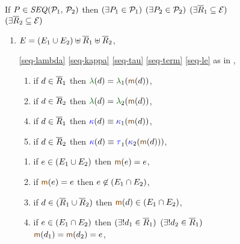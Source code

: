 \begin{figure}
  \raggedright
  
  \noindent
  If $\aPS \in \sSEMI{\aPSS_1}{\aPSS_2}$ then
  $(\exists P_1\in\mathcal{P}_1)$ $(\exists P_2\in\mathcal{P}_2)$
  $(\exists\overline{R}_1\subseteq\mathcal{E})$ $(\exists\overline{R}_2\subseteq\mathcal{E})$
  \begin{multicols}{2}
    \begin{enumerate}[topsep=0pt,label=(\textsc{s}\arabic*),ref=\textsc{s}\arabic*]
      \setcounter{enumi}{\value{BE}}
    \item \label{seq-E-phantom}
      $E=(E_1\cup E_2)\uplus\overline{R}_1 \uplus\overline{R}_2$,

    \item[\eqref{seq-lambda}]
      \eqref{seq-kappa}\;
      \eqref{seq-tau}\;
      \eqref{seq-term}\;
      \eqref{seq-le}\;
      as in ,

      \setcounter{enumi}{\value{lambda}}
    \item[] 
      \begin{enumerate}[leftmargin=0pt]
      \item \label{seq-lambda-phantom1}
        if $d\in \overline{R}_1$ then $\labeling(\bEv)=\labeling_1(\fmrg{\bEv})$,
      \item \label{seq-lambda-phantom2}
        if $d\in \overline{R}_2$ then $\labeling(\bEv)=\labeling_2(\fmrg{\bEv})$,
      \end{enumerate}

      \setcounter{enumi}{\value{kappa}}
    \item[] 
      \begin{enumerate}[leftmargin=0pt]
        \setcounter{enumii}{3}
      \item \label{seq-kappa-phantom1}
        if $d\in \overline{R}_1$ then $\labelingForm(\bEv)\riff\labelingForm_1(\fmrg{\bEv})$,
      \item \label{seq-kappa-phantom2}
        if $d\in \overline{R}_2$ then $\labelingForm(\bEv)\riff\aTr[1]{}{\labelingForm_2(\fmrg{\bEv})}$,
      \end{enumerate}

      \columnbreak
      \setcounter{enumi}{\value{m}}
    \item[] 
      \begin{enumerate}[leftmargin=0pt]
      \item \label{seq-m-real-cup}
        if $e\in(E_1\cup E_2)$ then $\fmrg{\aEv}=\aEv$,
      \item \label{seq-m-real-cap}
        if $\fmrg{\aEv}=\aEv$ then $e\not\in(E_1\cap E_2)$,
      \item \label{seq-m-phantom-forall}
        if $d\in (\overline{R}_1\cup\overline{R}_2)$ then
        $\fmrg{\bEv}\in (\aEvs_1\cap\aEvs_2)$,
      \item \label{seq-m-phantom-exists}
        if $e\in (E_1\cap E_2)$ then
        $(\exists!d_1\in\overline{R}_1)$ $(\exists!d_2\in\overline{R}_1)$
        $\fmrg{\bEv_1}=\fmrg{\bEv_2}=\aEv$,
      \end{enumerate}


\end{enumerate}
\end{multicols}
\end{figure}
